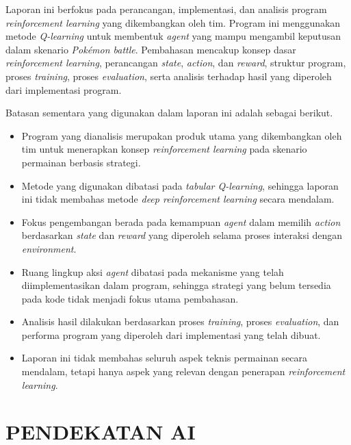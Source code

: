 \documentclass[11pt,a4paper,oneside]{report}
\begin{document}
Laporan ini berfokus pada perancangan, implementasi, dan analisis program \textit{reinforcement learning} yang dikembangkan oleh tim. Program ini menggunakan metode \textit{Q-learning} untuk membentuk \textit{agent} yang mampu mengambil keputusan dalam skenario \textit{Pokémon battle}. Pembahasan mencakup konsep dasar \textit{reinforcement learning}, perancangan \textit{state}, \textit{action}, dan \textit{reward}, struktur program, proses \textit{training}, proses \textit{evaluation}, serta analisis terhadap hasil yang diperoleh dari implementasi program.

Batasan sementara yang digunakan dalam laporan ini adalah sebagai berikut.
\begin{itemize}[leftmargin=*]
    \item Program yang dianalisis merupakan produk utama yang dikembangkan oleh tim untuk menerapkan konsep \textit{reinforcement learning} pada skenario permainan berbasis strategi.
    \item Metode yang digunakan dibatasi pada \textit{tabular Q-learning}, sehingga laporan ini tidak membahas metode \textit{deep reinforcement learning} secara mendalam.
    \item Fokus pengembangan berada pada kemampuan \textit{agent} dalam memilih \textit{action} berdasarkan \textit{state} dan \textit{reward} yang diperoleh selama proses interaksi dengan \textit{environment}.
    \item Ruang lingkup aksi \textit{agent} dibatasi pada mekanisme yang telah diimplementasikan dalam program, sehingga strategi yang belum tersedia pada kode tidak menjadi fokus utama pembahasan.
    \item Analisis hasil dilakukan berdasarkan proses \textit{training}, proses \textit{evaluation}, dan performa program yang diperoleh dari implementasi yang telah dibuat.
    \item Laporan ini tidak membahas seluruh aspek teknis permainan secara mendalam, tetapi hanya aspek yang relevan dengan penerapan \textit{reinforcement learning}.
\end{itemize}


\chapter{PENDEKATAN AI}
\label{bab:pendekatan}
\end{document}
